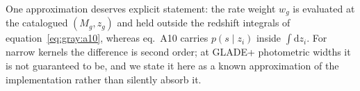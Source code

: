 One approximation deserves explicit statement: the rate weight $w_g$
is evaluated at the catalogued $(M_g, z_g)$ and held outside the
redshift integrals of equation~\eqref{eq:gray:a10}, whereas eq.~A10
carries $p(s \mid z_i)$ inside $\int \mathrm{d}z_i$.  For narrow
kernels the difference is second order; at GLADE+ photometric widths
it is not guaranteed to be, and we state it here as a known
approximation of the implementation rather than silently absorb it.
